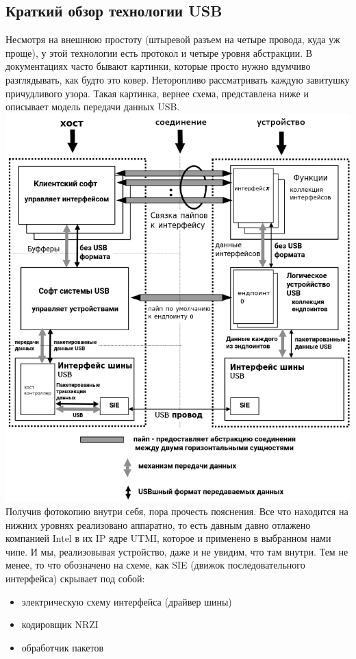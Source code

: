 \documentclass[12pt,a4paper]{article}
\begin{document}
\subsection{Краткий обзор технологии USB}\label{1}
    Несмотря на внешнюю простоту (штыревой разъем на четыре провода, куда уж
    проще), у этой технологии есть протокол и четыре уровня абстракции.
    В документациях часто бывают картинки, которые просто нужно вдумчиво
    разглядывать, как будто это ковер. Неторопливо рассматривать каждую
    завитушку причудливого узора. Такая картинка, вернее схема, представлена
    ниже и описывает модель передачи данных USB.\\
\includegraphics[width=15cm]{protocol.png}\\
    Получив фотокопию внутри себя, пора прочесть пояснения.
    Все что находится на нижних уровнях реализовано аппаратно, то есть давным
    давно отлажено компанией Intel в их IP ядре UTMI, которое и применено
    в выбранном нами чипе. И мы, реализовывая устройство,
    даже и не увидим, что там внутри. Тем не менее, то
    что обозначено на схеме, как SIE (движок последовательного интерфейса)
    скрывает под собой:
\begin{itemize}
    \item электрическую схему интерфейса (драйвер шины)
    \item кодировщик NRZI
    \item обработчик пакетов
\end{itemize}
\end{document}
